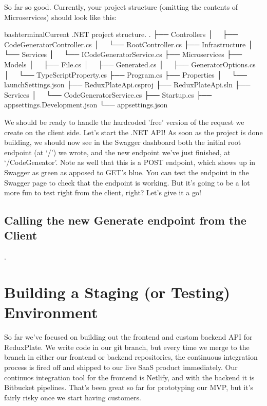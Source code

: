 \documentclass[paper=6in:9in,pagesize=pdftex,headinclude=on,footinclude=on,12pt,twoside]{scrbook}
\begin{document}
So far so good. Currently, your project structure (omitting the contents of Microservices) should look like this:

\begin{code}{bash}{terminal}{Current .NET project structure.}
.
├── Controllers
│   ├── CodeGeneratorController.cs
│   └── RootController.cs
├── Infrastructure
│   └── Services
│       └── ICodeGeneratorService.cs
├── Microservices
├── Models
│   ├── File.cs
│   ├── Generated.cs
│   ├── GeneratorOptions.cs
│   └── TypeScriptProperty.cs
├── Program.cs
├── Properties
│   └── launchSettings.json
├── ReduxPlateApi.csproj
├── ReduxPlateApi.sln
├── Services
│   └── CodeGeneratorService.cs
├── Startup.cs
├── appsettings.Development.json
└── appsettings.json
\end{code}

We should be ready to handle the hardcoded 'free' version of the request we create on the client side. Let's start the .NET API! As soon as the project is done building, we should now see in the Swagger dashboard both the initial root endpoint (at `/') we wrote, and the new endpoint we've just finished, at `/CodeGeneator'. Note as well that this is a POST endpoint, which shows up in Swagger as green as apposed to GET's blue. You can test the endpoint in the Swagger page to check that the endpoint is working. But it's going to be a lot more fun to test right from the client, right? Let's give it a go!

\section{Calling the new Generate endpoint from the Client}.



\chapter{Building a Staging (or Testing) Environment}

So far we've focused on building out the frontend and custom backend API for ReduxPlate. We write code in our  git branch, but every time we merge to the  branch in either our frontend or backend repositories, the continuous integration process is fired off and shipped to our live SaaS product immediately. Our continuos integration tool for the frontend is Netlify, and with the backend it is Bitbucket pipelines. That's been great so far for prototyping our MVP, but it's fairly risky once we start having customers.
\end{document}
